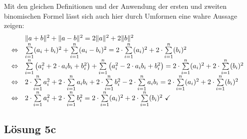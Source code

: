 Mit den gleichen Definitionen und der Anwendung der ersten und zweiten binomischen Formel lässt sich auch hier durch Umformen eine wahre Aussage zeigen:
\begin{equation*}
  \begin{array}{ c l }
    & \| a+b\| ^{2} +\| a-b\| ^{2} =2\| a\| ^{2} +2\| b\| ^{2}\\
    \Leftrightarrow  & \sum\limits _{i=1}^{n}( a_{i} +b_{i})^{2} +\sum\limits _{i=1}^{n}( a_{i} -b_{i})^{2} =2\cdot \sum\limits _{i=1}^{n}( a_{i})^{2} +2\cdot \sum\limits _{i=1}^{n}( b_{i})^{2}\\
    \Leftrightarrow  & \sum\limits _{i=1}^{n}\left( a_{i}^{2} +2\cdot a_{i} b_{i} +b_{i}^{2}\right) +\sum\limits _{i=1}^{n}\left( a_{i}^{2} -2\cdot a_{i} b_{i} +b_{i}^{2}\right) =2\cdot \sum\limits _{i=1}^{n}( a_{i})^{2} +2\cdot \sum\limits _{i=1}^{n}( b_{i})^{2}\\
    \Leftrightarrow  & 2\cdot \sum\limits _{i=1}^{n} a_{i}^{2} +2\cdot \sum\limits _{i=1}^{n} a_{i} b_{i} +2\cdot \sum\limits _{i=1}^{n} b_{i}^{2} -2\cdot \sum\limits _{i=1}^{n} a_{i} b_{i} =2\cdot \sum\limits _{i=1}^{n}( a_{i})^{2} +2\cdot \sum\limits _{i=1}^{n}( b_{i})^{2}\\
    \Leftrightarrow  & 2\cdot \sum\limits _{i=1}^{n} a_{i}^{2} +2\cdot \sum\limits _{i=1}^{n} b_{i}^{2} =2\cdot \sum\limits _{i=1}^{n}( a_{i})^{2} +2\cdot \sum\limits _{i=1}^{n}( b_{i})^{2} \ \checkmark 
  \end{array}
\end{equation*}


\subsection{Lösung 5c}

